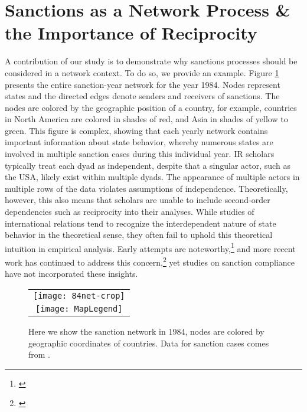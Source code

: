 \section*{Sanctions as a Network Process \& the Importance of Reciprocity}
\label{neteffects}

A contribution of our study is to demonstrate why sanctions processes should be considered in a network context. To do so, we provide an example. Figure \ref{fig:spaghetti} presents the entire sanction-year network for the year 1984.  Nodes represent states and the directed edges denote senders and receivers of sanctions. The nodes are colored by the geographic position of a country, for example, countries in North America are colored in shades of red, and Asia in shades of yellow to green. This figure is complex, showing that each yearly network contains important information about state behavior, whereby numerous states are involved in multiple sanction cases during this individual year. IR scholars typically treat each dyad as independent, despite that a singular actor, such as the USA, likely exist within multiple dyads. The appearance of multiple actors in multiple rows of the data violates assumptions of independence. Theoretically, however, this also means that scholars are unable to include second-order dependencies such as reciprocity into their analyses. While studies of international relations tend to recognize the interdependent nature of state behavior in the theoretical sense, they often fail to uphold this theoretical intuition in empirical analysis. Early attempts are noteworthy,\footnote{\cite{keohane1989reciprocity,goldstein1991reciprocity}} and more recent work has continued to address this concern,\footnote{\cite{mitchell2001,cranmer2014reciprocity}} yet studies on sanction compliance have not incorporated these insights. 

\begin{figure}[ht]
  \centering
  \begin{tabular}{c}
	  \texttt{[image: 84net-crop]} \\
	  \texttt{[image: MapLegend]}
  \end{tabular}
  \caption{Here we show the sanction network in 1984, nodes are colored by geographic coordinates of countries. Data for sanction cases comes from \citet{morgan2009threat}.}
  \label{fig:spaghetti}
\end{figure}
\FloatBarrier




